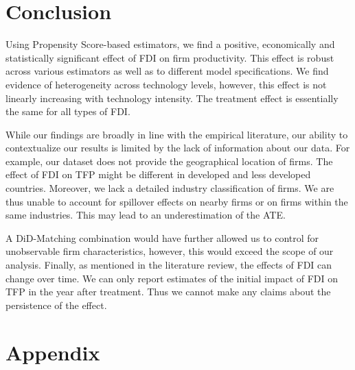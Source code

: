 \documentclass[a4paper,11pt]{scrartcl}
\begin{document}
\section{Conclusion}

Using Propensity Score-based estimators, we find a positive, economically and statistically significant effect of FDI on firm productivity. This effect is robust across various estimators as well as to different model specifications. We find evidence of heterogeneity across technology levels, however, this effect is not linearly increasing with technology intensity. 
The treatment effect is essentially the same for all types of FDI. 

While our findings are broadly in line with the empirical literature, our ability to contextualize our results is limited by the lack of information about our data. For example, our dataset does not provide the geographical location of firms. The effect of FDI on TFP might be different in developed and less developed countries. 
Moreover, we lack a detailed industry classification of firms. We are thus unable to account for spillover effects on nearby firms or on firms within the same industries. This may lead to an underestimation of the ATE.

A DiD-Matching combination would have further allowed us to control for 
unobservable firm characteristics, however, this would exceed the scope of our analysis. Finally, as mentioned in the literature review, the effects of FDI can change over time. 
We can only report estimates of the initial impact of FDI on TFP in the year after treatment. Thus we cannot make any claims about the persistence of the effect.  

\newpage

 
\newpage


\setcounter{page}{3} %

\appendix
\section{Appendix} 
\setcounter{table}{0}
\end{document}
